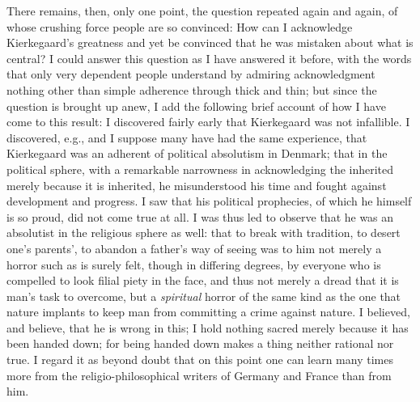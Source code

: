 \documentclass[12pt,a4paper,openany]{book}
\newcommand{\opage}[1]{\marginnote{\footnotesize\textit{[#1]}}}
\begin{document}
There remains, then, only one point, the question repeated again and
again, of whose crushing force people are so convinced: How can I
acknowledge Kierkegaard's greatness and yet be convinced that he was
mistaken about what is central? I could answer this question as I have
answered it before, with the words that only very dependent people
understand by admiring acknowledgment nothing other than simple adherence
through thick and thin; but since the question is brought up anew, I add
the following brief account of how I have come to this result: I
discovered fairly early that Kierkegaard was not infallible. I
discovered, e.g., and I suppose many have had the same experience, that
Kierkegaard was an adherent of political absolutism in Denmark; that in
the political sphere, with a remarkable narrowness in acknowledging the
inherited merely because it is inherited, he misunderstood his time and
fought against development and progress. I saw that his political
prophecies, of which he himself is so proud, did not come true at all. I
was thus led to observe that he was an absolutist in the religious sphere
as well: that to break with tradition, to desert one's parents', to abandon
a father's way of seeing was to him not merely a horror such as is surely
felt, though in differing degrees, by everyone who is compelled
to look filial piety in the face, and thus not merely a dread that it is
man's task to overcome, but a \emph{spiritual} horror of the same kind as
the one that nature implants to keep man from committing a crime against
nature. I believed, and
\opage{100}believe, that he is wrong in this; I hold nothing sacred merely
because it has been handed down; for being handed down makes a thing
neither rational nor true. I regard it as beyond doubt that on this point
one can learn many times more from the religio-philosophical writers of
Germany and France than from him.
\end{document}
